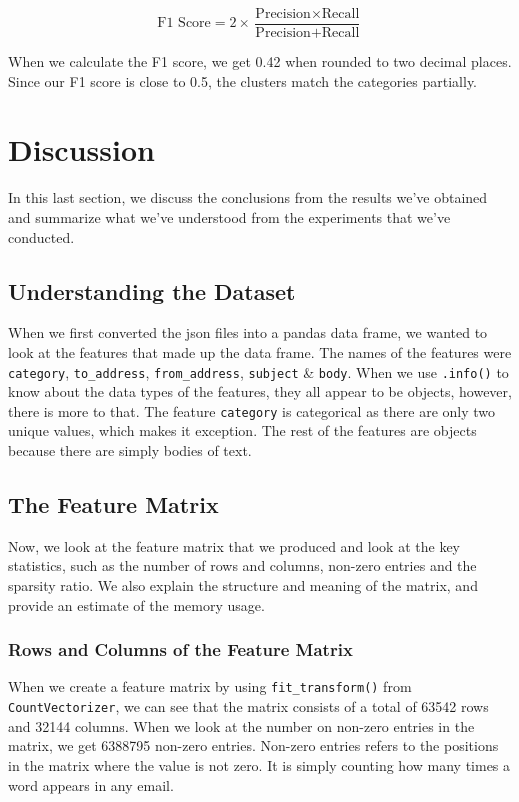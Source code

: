 \documentclass[a4paper, twocolumn]{article}
\begin{document}
\begin{equation}
    \text{F1 Score} = 2 \times \frac{\text{Precision} \times \text{Recall}}{\text{Precision} + \text{Recall}}
    \label{eq:f1}
\end{equation}

\noindent When we calculate the F1 score, we get 0.42 when rounded to two decimal places. Since our F1 score is close to 0.5, the clusters match the 
categories partially.


\section{Discussion}
In this last section, we discuss the conclusions from the results we've obtained and summarize what we've understood from the experiments that we've 
conducted.

\subsection{Understanding the Dataset}
When we first converted the json files into a pandas data frame, we wanted to look at the features that made up the data frame. The names of the features
were \texttt{category}, \texttt{to\_address}, \texttt{from\_address}, \texttt{subject} \& \texttt{body}. When we use \texttt{.info()} to know about the data 
types of the features, they all appear to be objects, however, there is more to that. The feature \texttt{category} is categorical as there are only two 
unique values, which makes it exception. The rest of the features are objects because there are simply bodies of text. 

\subsection{The Feature Matrix}
Now, we look at the feature matrix that we produced and look at the key statistics, such as the number of rows and columns, non-zero entries and the sparsity
ratio. We also explain the structure and meaning of the matrix, and provide an estimate of the memory usage.

\subsubsection{Rows and Columns of the Feature Matrix}
When we create a feature matrix by using \texttt{fit\_transform()} from \texttt{CountVectorizer}, we can see that the matrix consists of a total of 63542
rows and 32144 columns. When we look at the number on non-zero entries in the matrix, we get 6388795 non-zero entries. Non-zero entries refers to the 
positions in the matrix where the value is not zero. It is simply counting how many times a word appears in any email.
\end{document}
